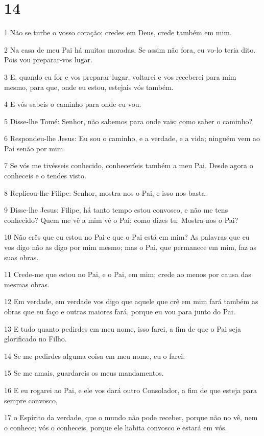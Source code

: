 \chapter{14}

\par 1 Não se turbe o vosso coração; credes em Deus, crede também em mim.
\par 2 Na casa de meu Pai há muitas moradas. Se assim não fora, eu vo-lo teria dito. Pois vou preparar-vos lugar.
\par 3 E, quando eu for e vos preparar lugar, voltarei e vos receberei para mim mesmo, para que, onde eu estou, estejais vós também.
\par 4 E vós sabeis o caminho para onde eu vou.
\par 5 Disse-lhe Tomé: Senhor, não sabemos para onde vais; como saber o caminho?
\par 6 Respondeu-lhe Jesus: Eu sou o caminho, e a verdade, e a vida; ninguém vem ao Pai senão por mim.
\par 7 Se vós me tivésseis conhecido, conheceríeis também a meu Pai. Desde agora o conheceis e o tendes visto.
\par 8 Replicou-lhe Filipe: Senhor, mostra-nos o Pai, e isso nos basta.
\par 9 Disse-lhe Jesus: Filipe, há tanto tempo estou convosco, e não me tens conhecido? Quem me vê a mim vê o Pai; como dizes tu: Mostra-nos o Pai?
\par 10 Não crês que eu estou no Pai e que o Pai está em mim? As palavras que eu vos digo não as digo por mim mesmo; mas o Pai, que permanece em mim, faz as suas obras.
\par 11 Crede-me que estou no Pai, e o Pai, em mim; crede ao menos por causa das mesmas obras.
\par 12 Em verdade, em verdade vos digo que aquele que crê em mim fará também as obras que eu faço e outras maiores fará, porque eu vou para junto do Pai.
\par 13 E tudo quanto pedirdes em meu nome, isso farei, a fim de que o Pai seja glorificado no Filho.
\par 14 Se me pedirdes alguma coisa em meu nome, eu o farei.
\par 15 Se me amais, guardareis os meus mandamentos.
\par 16 E eu rogarei ao Pai, e ele vos dará outro Consolador, a fim de que esteja para sempre convosco,
\par 17 o Espírito da verdade, que o mundo não pode receber, porque não no vê, nem o conhece; vós o conheceis, porque ele habita convosco e estará em vós.
